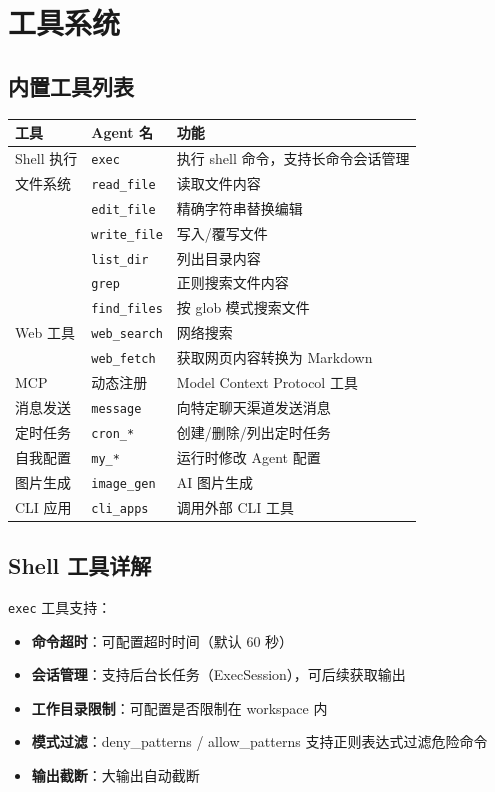 \documentclass[12pt,a4paper,UTF8]{ctexart}
\begin{document}
\chapter{工具系统}

\section{内置工具列表}

\begin{longtable}{L{3cm} L{2.5cm} L{9.5cm}}
\toprule
\textbf{工具} & \textbf{Agent 名} & \textbf{功能} \\
\midrule
Shell 执行 & \texttt{exec} & 执行 shell 命令，支持长命令会话管理 \\
文件系统 & \texttt{read\_file} & 读取文件内容 \\
 & \texttt{edit\_file} & 精确字符串替换编辑 \\
 & \texttt{write\_file} & 写入/覆写文件 \\
 & \texttt{list\_dir} & 列出目录内容 \\
 & \texttt{grep} & 正则搜索文件内容 \\
 & \texttt{find\_files} & 按 glob 模式搜索文件 \\
Web 工具 & \texttt{web\_search} & 网络搜索 \\
 & \texttt{web\_fetch} & 获取网页内容转换为 Markdown \\
MCP & 动态注册 & Model Context Protocol 工具 \\
消息发送 & \texttt{message} & 向特定聊天渠道发送消息 \\
定时任务 & \texttt{cron\_*} & 创建/删除/列出定时任务 \\
自我配置 & \texttt{my\_*} & 运行时修改 Agent 配置 \\
图片生成 & \texttt{image\_gen} & AI 图片生成 \\
CLI 应用 & \texttt{cli\_apps} & 调用外部 CLI 工具 \\
\bottomrule
\end{longtable}

\section{Shell 工具详解}

\texttt{exec} 工具支持：
\begin{itemize}
    \item \textbf{命令超时}：可配置超时时间（默认 60 秒）
    \item \textbf{会话管理}：支持后台长任务（ExecSession），可后续获取输出
    \item \textbf{工作目录限制}：可配置是否限制在 workspace 内
    \item \textbf{模式过滤}：deny\_patterns / allow\_patterns 支持正则表达式过滤危险命令
    \item \textbf{输出截断}：大输出自动截断
\end{itemize}
\end{document}
